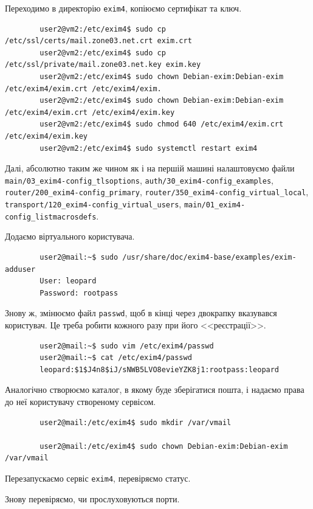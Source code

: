 \documentclass[14pt, a4paper]{extreport}
\begin{document}
	Переходимо в директорію \texttt{exim4}, копіюємо сертифікат та ключ.
	
	\begin{verbatim}
		user2@vm2:/etc/exim4$ sudo cp /etc/ssl/certs/mail.zone03.net.crt exim.crt
		user2@vm2:/etc/exim4$ sudo cp /etc/ssl/private/mail.zone03.net.key exim.key
		user2@vm2:/etc/exim4$ sudo chown Debian-exim:Debian-exim /etc/exim4/exim.crt /etc/exim4/exim.
		user2@vm2:/etc/exim4$ sudo chown Debian-exim:Debian-exim /etc/exim4/exim.crt /etc/exim4/exim.key
		user2@vm2:/etc/exim4$ sudo chmod 640 /etc/exim4/exim.crt /etc/exim4/exim.key
		user2@vm2:/etc/exim4$ sudo systemctl restart exim4
	\end{verbatim}
	
	Далі, абсолютно таким же чином як і на першій машині налаштовуємо файли \texttt{main/03\_exim4-config\_tlsoptions}, \texttt{auth/30\_exim4-config\_examples}, \texttt{router/200\_exim4-config\_primary},
	\texttt{router/350\_exim4-config\_virtual\_local},
	\texttt{transport/120\_exim4-config\_virtual\_users},
	\texttt{main/01\_exim4-config\_listmacrosdefs}.
	
	Додаємо віртуального користувача.
	
	\begin{verbatim}
		user2@mail:~$ sudo /usr/share/doc/exim4-base/examples/exim-adduser 
		User: leopard
		Password: rootpass
	\end{verbatim}
	
	Знову ж, змінюємо файл \texttt{passwd}, щоб в кінці через двокрапку вказувався користувач. Це треба робити кожного разу при його <<реєстрації>>.
	
	\begin{verbatim}
		user2@mail:~$ sudo vim /etc/exim4/passwd
		user2@mail:~$ cat /etc/exim4/passwd
		leopard:$1$J4n8$iJ/sNWB5LVO8evieYZK8j1:rootpass:leopard
	\end{verbatim}
	
	Аналогічно створюємо каталог, в якому буде зберігатися пошта, і надаємо права до неї користувачу створеному сервісом.
	
	\begin{verbatim}
		user2@mail:/etc/exim4$ sudo mkdir /var/vmail
		
		user2@mail:/etc/exim4$ sudo chown Debian-exim:Debian-exim /var/vmail
	\end{verbatim}
	
	Перезапускаємо сервіс \texttt{exim4}, перевіряємо статус.
	
	Знову перевіряємо, чи прослуховуються порти.
	
\end{document}
